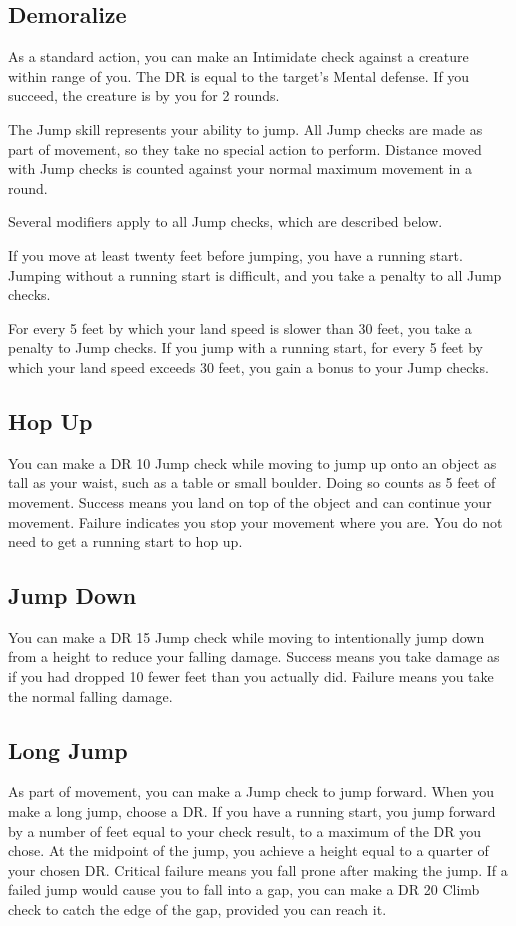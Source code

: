    \subsection{Demoralize}\label{Demoralize}
        As a standard action, you can make an Intimidate check against a creature within \rngmed range of you. The DR is equal to the target's Mental defense. If you succeed, the creature is \shaken by you for 2 rounds.

        The Jump skill represents your ability to jump. All Jump checks are made as part of movement, so they take no special action to perform. Distance moved with Jump checks is counted against your normal maximum movement in a round.

        Several modifiers apply to all Jump checks, which are described below.

        \label{Running Start} If you move at least twenty feet before jumping, you have a running start. Jumping without a running start is difficult, and you take a  penalty to all Jump checks.

         For every 5 feet by which your land speed is slower than 30 feet, you take a  penalty to Jump checks. If you jump with a running start, for every 5 feet by which your land speed exceeds 30 feet, you gain a  bonus to your Jump checks.

    \subsection{Hop Up}
        You can make a DR 10 Jump check while moving to jump up onto an object as tall as your waist, such as a table or small boulder. Doing so counts as 5 feet of movement. Success means you land on top of the object and can continue your movement. Failure indicates you stop your movement where you are. You do not need to get a running start to hop up.

    \subsection{Jump Down}
        You can make a DR 15 Jump check while moving to intentionally jump down from a height to reduce your falling damage. Success means you take damage as if you had dropped 10 fewer feet than you actually did. Failure means you take the normal falling damage.

    \subsection{Long Jump}
        As part of movement, you can make a Jump check to jump forward. When you make a long jump, choose a DR\@. If you have a running start, you jump forward by a number of feet equal to your check result, to a maximum of the DR you chose. At the midpoint of the jump, you achieve a height equal to a quarter of your chosen DR. Critical failure means you fall prone after making the jump. If a failed jump would cause you to fall into a gap, you can make a DR 20 Climb check to catch the edge of the gap, provided you can reach it.

